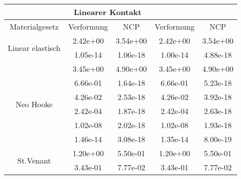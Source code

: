 \begin{table} 
\centering 
\begin{tabular}{c|cc|cc|} 
\cline{2-5} 
 & \multicolumn{2}{|c|}{Linearer Kontakt} &  \\ 
\hline 
\multicolumn{1}{|c|}{Materialgesetz} & \multicolumn{1}{c|}{Verformung} & \multicolumn{1}{c|}{NCP} & \multicolumn{1}{c|}{Verformung} & \multicolumn{1}{c|}{NCP} \\ 
\hline 
\multicolumn{1}{|c|}{\multirow{2}{*}{Linear elastisch}} &\multicolumn{1}{|c|}{  2.42e+00} & \multicolumn{1}{|c|}{  3.54e+00} & \multicolumn{1}{|c|}{  2.42e+00} & \multicolumn{1}{|c|}{  3.54e+00} \\ 
\multicolumn{1}{|c|}{} & \multicolumn{1}{|c|}{  1.05e-14} & \multicolumn{1}{|c|}{  1.06e-18} & \multicolumn{1}{|c|}{  1.00e-14} & \multicolumn{1}{|c|}{  4.88e-18} \\ 
\hline 
\multicolumn{1}{|c|}{\multirow{6}{*}{Neo Hooke}} &\multicolumn{1}{|c|}{  3.45e+00} & \multicolumn{1}{|c|}{  4.90e+00} & \multicolumn{1}{|c|}{  3.45e+00} & \multicolumn{1}{|c|}{  4.90e+00} \\ 
\multicolumn{1}{|c|}{} & \multicolumn{1}{|c|}{  6.66e-01} & \multicolumn{1}{|c|}{  1.64e-18} & \multicolumn{1}{|c|}{  6.66e-01} & \multicolumn{1}{|c|}{  5.23e-18} \\ 
\multicolumn{1}{|c|}{} & \multicolumn{1}{|c|}{  4.26e-02} & \multicolumn{1}{|c|}{  2.53e-18} & \multicolumn{1}{|c|}{  4.26e-02} & \multicolumn{1}{|c|}{  3.92e-18} \\ 
\multicolumn{1}{|c|}{} & \multicolumn{1}{|c|}{  2.42e-04} & \multicolumn{1}{|c|}{  1.87e-18} & \multicolumn{1}{|c|}{  2.42e-04} & \multicolumn{1}{|c|}{  2.63e-18} \\ 
\multicolumn{1}{|c|}{} & \multicolumn{1}{|c|}{  1.02e-08} & \multicolumn{1}{|c|}{  2.02e-18} & \multicolumn{1}{|c|}{  1.02e-08} & \multicolumn{1}{|c|}{  1.93e-18} \\ 
\multicolumn{1}{|c|}{} & \multicolumn{1}{|c|}{  1.46e-14} & \multicolumn{1}{|c|}{  3.08e-18} & \multicolumn{1}{|c|}{  1.35e-14} & \multicolumn{1}{|c|}{  8.00e-19} \\ 
\hline 
\multicolumn{1}{|c|}{\multirow{9}{*}{St.Venant}} &\multicolumn{1}{|c|}{  1.20e+00} & \multicolumn{1}{|c|}{  5.50e-01} & \multicolumn{1}{|c|}{  1.20e+00} & \multicolumn{1}{|c|}{  5.50e-01} \\ 
\multicolumn{1}{|c|}{} & \multicolumn{1}{|c|}{  3.43e-01} & \multicolumn{1}{|c|}{  7.77e-02} & \multicolumn{1}{|c|}{  3.43e-01} & \multicolumn{1}{|c|}{  7.77e-02} \\ 

\end{tabular}
\end{table}
